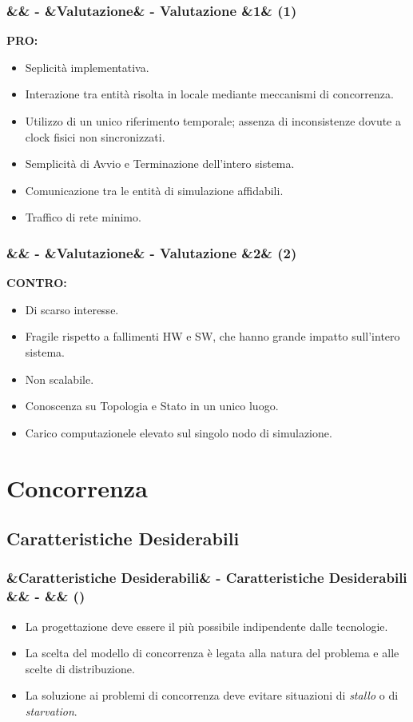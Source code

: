 \documentclass[slidestop,compress,blackandwhite]{beamer}
\newcommand{\ii}[1]{\textit{#1}}
\newcommand{\PRO}{\textbf{PRO:}}
\newcommand{\CONTRO}{\textbf{CONTRO:}}
\newcommand{\cm}[1]{\vspace{#1cm}}
\newcommand{\newtitle}[4]{
	#1 
	\ifx&#2&%
	\else
  		\large- #2
	\fi
	\ifx&#3&%
	\else
  		\normalsize- #3
	\fi
	\ifx&#4&%
	\else
  		\normalsize (#4)
	\fi
}
\newcommand{\newframe}[5]{
	\begin{frame}
		\frametitle{\newtitle{#1}{#2}{#3}{#4}}
		#5
	\end{frame}
}
\newcommand{\myitemize}[1]{\begin{itemize}#1\end{itemize}}
\begin{document}
	\newframe{}{}{Valutazione}{1}{
		\vspace{0.5cm}
		\PRO
			\begin{itemize}
				\item Seplicità implementativa.
				\item Interazione tra entità risolta in locale mediante meccanismi di concorrenza.
				\item Utilizzo di un unico riferimento temporale; assenza di inconsistenze dovute a clock fisici non sincronizzati.
				\item Semplicità di Avvio e Terminazione dell'intero sistema.
				\item Comunicazione tra le entità di simulazione affidabili.
				\item Traffico di rete minimo.
			\end{itemize}
	}
	
	
	\newframe{}{}{Valutazione}{2}{
		\cm{0.5}
		\CONTRO
			\begin{itemize}
				\item Di scarso interesse.
				\item Fragile rispetto a fallimenti HW e SW, che hanno grande impatto sull'intero sistema.
				\item Non scalabile.
				\item Conoscenza su Topologia e Stato in un unico luogo.
				\item Carico computazionele elevato sul singolo nodo di simulazione.
			\end{itemize}
	}
	

\section{Concorrenza}\label{concurrency}

	\subsection{Caratteristiche Desiderabili}
	\newframe{}{Caratteristiche Desiderabili}{}{}{
		\cm{0.5}
		\myitemize{
			\item La progettazione deve essere il più possibile indipendente dalle tecnologie.
			\cm{0.5}
			\item La scelta del modello di concorrenza è legata alla natura del problema e alle scelte di distribuzione.
			\cm{0.5}
			\item La soluzione ai problemi di concorrenza deve evitare situazioni di \ii{stallo} o di \ii{starvation}.
		}
	}
	
\end{document}
